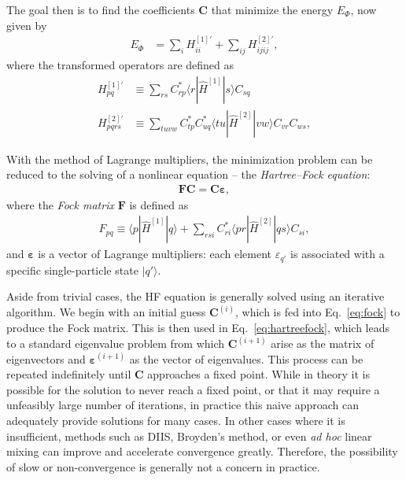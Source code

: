 The goal then is to find the coefficients $\bm C$ that minimize the energy $E_{\Phi}$, now given by
\begin{align}
  E_{\Phi} &= \sum_i H^{[1] \prime}_{i i} + \sum_{i j} H^{[2] \prime}_{i j i j} \label{eq:hfenergy},
\end{align}
where the transformed operators are defined as
\begin{align}
  H^{[1] \prime}_{p q} &\equiv \sum_{r s} C_{r p}^* \langle r | \hat{H}^{[1]} | s \rangle C_{s q}^{} \label{eq:hftransform1} \\
  H^{[2] \prime}_{p q r s} &\equiv \sum_{t u v w} C_{t p}^* C_{u q}^* \langle t u | \hat{H}^{[2]} | v w \rangle C_{v r}^{} C_{w s}^{}, \label{eq:hftransform2}
\end{align}

With the method of Lagrange multipliers, the minimization problem can be reduced to the solving of a nonlinear equation -- the \textit{Hartree--Fock equation}:
\begin{align} \label{eq:hartreefock}
  \bm{F} \bm{C} = \bm{C} \bm{\varepsilon},
\end{align}
where the \textit{Fock matrix} $\bm F$ is defined as
\begin{align} \label{eq:fock}
  F_{p q} \equiv \langle p | \hat{H}^{[1]} | q \rangle + \sum_{r s i} C_{r i}^* \langle p r | \hat{H}^{[2]} | q s \rangle C_{s i}^{},
\end{align}
and $\bm{\varepsilon}$ is a vector of Lagrange multipliers: each element $\varepsilon_{q'}$ is associated with a specific single-particle state $|q'\rangle$.

Aside from trivial cases, the HF equation is generally solved using an iterative algorithm.  We begin with an initial guess $\bm{C}^{(i)}$, which is fed into Eq.\ \eqref{eq:fock} to produce the Fock matrix.  This is then used in Eq.\ \eqref{eq:hartreefock}, which leads to a standard eigenvalue problem from which $\bm{C}^{(i + 1)}$ arise as the matrix of eigenvectors and $\bm{\varepsilon}^{(i + 1)}$ as the vector of eigenvalues.  This process can be repeated indefinitely until $\bm{C}$ approaches a fixed point.  While in theory it is possible for the solution to never reach a fixed point, or that it may require a unfeasibly large number of iterations, in practice this naive approach can adequately provide solutions for many cases.  In other cases where it is insufficient, methods such as DIIS, Broyden's method, or even \textit{ad hoc} linear mixing can improve and accelerate convergence greatly.  Therefore, the possibility of slow or non-convergence is generally not a concern in practice.

